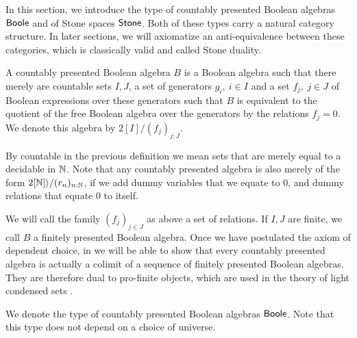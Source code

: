 In this section, we introduce the type of countably presented Boolean algebras $\mathsf{Boole}$ and of Stone spaces $\mathsf{Stone}$. 
Both of these types carry a natural category structure. 
In later sections, we will axiomatize an anti-equivalence between these categories, 
which is classically valid and called Stone duality. 


\begin{definition}
  A countably presented Boolean algebra $B$ is a Boolean algebra such that there merely are 
  countable sets $I,J$, 
  a set of generators $g_i,~{i\in I}$ and a set $f_j,~{j\in J}$ of Boolean expressions over these generators 
  such that $B$ is equivalent to the quotient of the free Boolean algebra over the generators by the relations
  $f_j=0$. We denote this algebra by $2[I]/(f_j)_{j:J}$.
\end{definition} 

\begin{remark}
By countable in the previous definition we mean sets that are merely equal to a decidable in $\mathbb{N}$. Note that any countably presented algebra is also merely of the form $2[\mathbb{N}]\rangle / (r_n)_{n:\mathbb{N}}$, if we add dummy variables that we equate to $0$, and dummy relations that equate $0$ to itself.
\end{remark}

We will call the family $(f_j)_{j\in J}$ as above a set of relations. 
If $I,J$ are finite, we call $B$ a finitely presented Boolean algebra. 
Once we have postulated the axiom of dependent choice, 
in 
we will be able to show that every countably presented algebra 
is actually a colimit of a sequence of finitely presented Boolean algebras.
They are therefore dual to pro-finite objects, which are used 
in the theory of light condensed sets \cite{Scholze,Dagur,TODO}.

\begin{remark}
  We denote the type of countably presented Boolean algebras $\mathsf{Boole}$. 
  Note that this type does not depend on a choice of universe. 
\end{remark}

